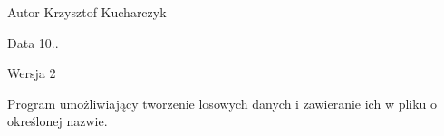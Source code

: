 \begin{DoxyAuthor}{\-Autor}
\-Krzysztof \-Kucharczyk 
\end{DoxyAuthor}
\begin{DoxyDate}{\-Data}
10.. 
\end{DoxyDate}
\begin{DoxyVersion}{\-Wersja}
2
\end{DoxyVersion}
\-Program umożliwiający tworzenie losowych danych i zawieranie ich w pliku o określonej nazwie. 